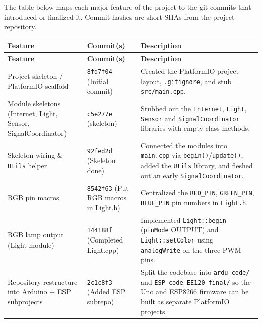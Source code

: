 \documentclass[11pt]{article}
\begin{document}
The table below maps each major feature of the project to the git commits
that introduced or finalized it. Commit hashes are short SHAs from the
project repository.

\begin{longtable}{>{\raggedright\arraybackslash}p{}
                  >{\raggedright\arraybackslash}p{}
                  >{\raggedright\arraybackslash}p{}}
\toprule
\textbf{Feature} & \textbf{Commit(s)} & \textbf{Description} \\
\midrule
\endfirsthead

\toprule
\textbf{Feature} & \textbf{Commit(s)} & \textbf{Description} \\
\midrule
\endhead

Project skeleton / PlatformIO scaffold &
\texttt{8fd7f04} \newline (Initial commit) &
Created the PlatformIO project layout, \texttt{.gitignore}, and stub \texttt{src/main.cpp}. \\

Module skeletons (Internet, Light, Sensor, SignalCoordinator) &
\texttt{c5e277e} \newline (skeleton) &
Stubbed out the \texttt{Internet}, \texttt{Light}, \texttt{Sensor} and \texttt{SignalCoordinator} libraries with empty class methods. \\

Skeleton wiring \& \texttt{Utils} helper &
\texttt{92fed2d} \newline (Skeleton done) &
Connected the modules into \texttt{main.cpp} via \texttt{begin()}/\texttt{update()}, added the \texttt{Utils} library, and fleshed out an early \texttt{SignalCoordinator}. \\

RGB pin macros &
\texttt{8542f63} \newline (Put RGB macros in Light.h) &
Centralized the \texttt{RED\_PIN}, \texttt{GREEN\_PIN}, \texttt{BLUE\_PIN} pin numbers in \texttt{Light.h}. \\

RGB lamp output (Light module) &
\texttt{144188f} \newline (Completed Light.cpp) &
Implemented \texttt{Light::begin} (\texttt{pinMode} OUTPUT) and \texttt{Light::setColor} using \texttt{analogWrite} on the three PWM pins. \\

Repository restructure into Arduino + ESP subprojects &
\texttt{2c1c8f3} \newline (Added ESP subrepo) &
Split the codebase into \texttt{ardu code/} and \texttt{ESP\_code\_EE120\_final/} so the Uno and ESP8266 firmware can be built as separate PlatformIO projects. \\


\end{longtable}
\end{document}
